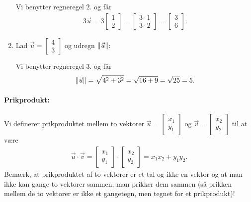 \begin{enumerate}
Vi benytter regneregel $2$. og får
\begin{align*}
3\vec{u} = 3\begin{bmatrix} 1 \\ 2 \end{bmatrix} = \begin{bmatrix} 3\cdot 1 \\ 3 \cdot 2 \end{bmatrix}  = \begin{bmatrix} 3 \\ 6 \end{bmatrix}. 
\end{align*}
\item Lad $\vec{u}= \begin{bmatrix} 4 \\ 3 \end{bmatrix}$ og udregn $\Vert \vec{u}\Vert$:

Vi benytter regneregel $3.$ og får
\begin{align*}
\Vert \vec{u}\Vert = \sqrt{4^2+3^2} = \sqrt{16+9}= \sqrt{25}=5.
\end{align*}
\end{enumerate}

\paragraph*{Prikprodukt:}
Vi definerer prikproduktet mellem to vektorer $\vec{u} = \begin{bmatrix} x_1 \\ y_1 \end{bmatrix}$ og $\vec{v} = \begin{bmatrix} x_2 \\ y_2 \end{bmatrix}$ til at være
\begin{align}\label{eq:vec2d1prikprodukt}
\vec{u} \cdot \vec{v} =\begin{bmatrix} x_1 \\ y_1 \end{bmatrix} \cdot \begin{bmatrix} x_2 \\ y_2 \end{bmatrix} = x_1 x_2 + y_1  y_2.
\end{align}
Bemærk, at prikproduktet af to vektorer er et tal og ikke en vektor og at man ikke kan gange to vektorer sammen, man prikker dem sammen (så prikken mellem de to vektorer er ikke et gangetegn, men tegnet for et prikprodukt)!

